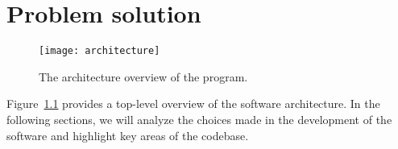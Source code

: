 \chapter{Problem solution}\label{ch:problem-solution}

\begin{figure}[H]
    \centering
    \texttt{[image: architecture]}
    \caption{The architecture overview of the program.}\label{fig:software-architecture}
\end{figure}

Figure~\ref{fig:software-architecture} provides a top-level overview of the software architecture.
In the following sections,
we will analyze the choices made in the development of the software and highlight key areas of the codebase.





